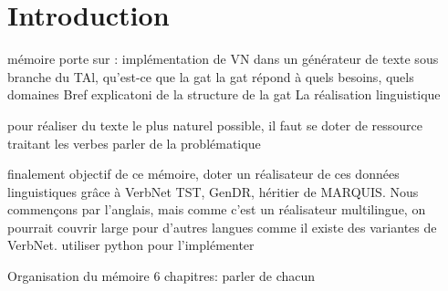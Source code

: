 
\chapter*{Introduction}


mémoire porte sur : implémentation de VN dans un générateur de texte
sous branche du TAl, qu'est-ce que la gat
la gat répond à quels besoins, quels domaines
Bref explicatoni de la structure de la gat
La réalisation linguistique

pour réaliser du texte le plus naturel possible, il faut se doter de ressource traitant les verbes
parler de la problématique

finalement objectif de ce mémoire, doter un réalisateur de ces données linguistiques grâce à VerbNet
TST, GenDR, héritier de MARQUIS. Nous commençons par l'anglais, mais comme c'est un réalisateur multilingue, on pourrait couvrir large pour d'autres langues comme il existe des variantes de VerbNet. utiliser python pour l'implémenter

Organisation du mémoire 6 chapitres:  parler de chacun







